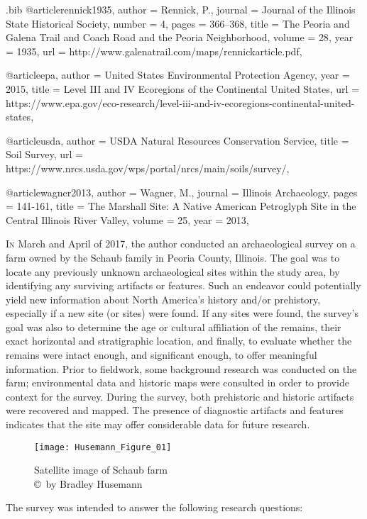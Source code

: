 \begin{filecontents}{\IJSRAidentifier.bib}
	@article{rennick1935,
		author = {Rennick, P.},
		journal = {Journal of the Illinois State Historical Society},
		number = {4},
		pages = {366--368},
		title = {The Peoria and Galena Trail and Coach Road and the Peoria Neighborhood},
		volume = {28},
		year = {1935},
		url = {http://www.galenatrail.com/maps/rennickarticle.pdf},
	}

	@article{epa,
		author = {United States Environmental Protection Agency},
		year = {2015},
		title = {Level III and IV Ecoregions of the Continental United States},
		url = {https://www.epa.gov/eco-research/level-iii-and-iv-ecoregions-continental-united-states},
	}

	@article{usda,
		author = {USDA Natural Resources Conservation Service},
		title = {Soil Survey},
		url = {https://www.nrcs.usda.gov/wps/portal/nrcs/main/soils/survey/},
	}

	@article{wagner2013,
		author = {Wagner, M.},
		journal = {Illinois Archaeology},
		pages = {141-161},
		title = {The Marshall Site: A Native American Petroglyph Site in the Central Illinois River Valley},
		volume = {25},
		year = {2013},
	}
\end{filecontents}

\IJSRAopening
\lettrine{I}{n} March and April of 2017, the author conducted an archaeological survey on a farm owned by the Schaub family in Peoria County, Illinois. The goal was to locate any previously unknown archaeological sites within the study area, by identifying any surviving artifacts or features. Such an endeavor could potentially yield new information about North America’s history and/or prehistory, especially if a new site (or sites) were found. If any sites were found, the survey’s goal was also to determine the age or cultural affiliation of the remains, their exact horizontal and stratigraphic location, and finally, to evaluate whether the remains were intact enough, and significant enough, to offer meaningful information. Prior to fieldwork, some background research was conducted on the farm; environmental data and historic maps were consulted in order to provide context for the survey. During the survey, both prehistoric and historic artifacts were recovered and mapped. The presence of diagnostic artifacts and features indicates that the site may offer considerable data for future research.

\begin{wrapfigure}{O}[1cm]{0.5\textwidth}
	\texttt{[image: Husemann\_Figure\_01]}
	\caption{Satellite image of Schaub farm
		{\normalfont\scriptsize \\ \copyright\ by Bradley Husemann
	}}
	\label{fig:Husemann_Figure_01}
\end{wrapfigure}
The survey was intended to answer the following research questions:


